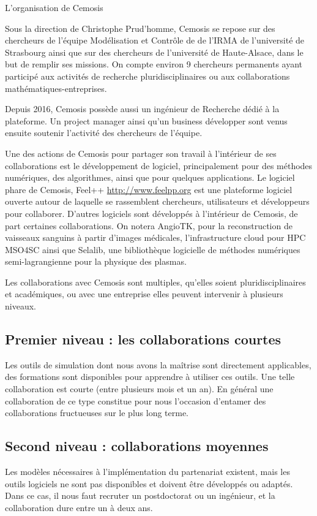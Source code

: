 L'organisation de Cemosis

Sous la direction de Christophe Prud'homme, Cemosis se repose sur des chercheurs de l'équipe Modélisation et Contrôle de de l'IRMA de l'université de Strasbourg ainsi que sur des chercheurs de l'université de Haute-Alsace, dans le but de remplir ses missions. On compte environ 9 chercheurs permanents ayant participé aux activités de recherche pluridisciplinaires ou aux collaborations mathématiques-entreprises.

Depuis 2016, Cemosis possède aussi un ingénieur de Recherche dédié à la plateforme. Un project manager ainsi qu'un business développer sont venus ensuite	 soutenir l'activité des chercheurs de l'équipe.

Une des actions de Cemosis pour partager son travail à l'intérieur de ses collaborations est le développement de logiciel, principalement pour des méthodes numériques, des algorithmes, ainsi que pour quelques applications.
Le logiciel phare de Cemosis, Feel++ \url{http://www.feelpp.org} est une plateforme logiciel ouverte autour de laquelle se rassemblent chercheurs, utilisateurs et développeurs pour collaborer.
D'autres logiciels sont développés à l'intérieur de Cemosis, de part certaines collaborations. On notera AngioTK, pour la reconstruction de vaisseaux sanguins à partir d'images médicales, l'infrastructure cloud pour HPC MSO4SC ainsi que Selalib, une bibliothèque logicielle de méthodes numériques semi-lagrangienne pour la physique des plasmas.

Les collaborations avec Cemosis sont multiples, qu'elles soient pluridisciplinaires et académiques, ou avec une entreprise elles peuvent intervenir à plusieurs niveaux.

\subsection*{Premier niveau : les collaborations courtes}
Les outils de simulation dont nous avons la maîtrise sont directement applicables, des formations sont disponibles pour apprendre à utiliser ces outils. Une telle collaboration est courte (entre plusieurs mois et un an). En général une collaboration de ce type constitue pour nous l'occasion d'entamer des collaborations fructueuses sur le plus long terme.

\subsection*{Second niveau : collaborations moyennes}
Les modèles nécessaires à l'implémentation du partenariat existent, mais les outils logiciels ne sont pas disponibles et doivent être développés ou adaptés. Dans ce cas, il nous faut recruter un postdoctorat ou un ingénieur, et la collaboration dure entre un à deux ans.


